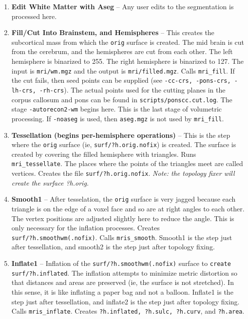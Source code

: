 \documentclass[paper=a4, fontsize=11pt]{scrartcl} %
\numberwithin{equation}{section} %
\numberwithin{figure}{section} %
\numberwithin{table}{section} %
\begin{document}
\begin{enumerate}
    \item \textbf{Edit White Matter with Aseg} -- Any user edits to the segmentation is processed here.
    
    \item \textbf{Fill/Cut Into Brainstem, and Hemispheres} --  This creates the subcortical mass from which the \texttt{orig} surface is created. The mid brain is cut from the cerebrum, and the hemispheres are cut from each other. The left hemisphere is binarized to 255. The right hemisphere is binarized to 127. The input is \texttt{mri/wm.mgz} and the output is \texttt{mri/filled.mgz}. Calls \texttt{mri\_fill}. If the cut fails, then seed points can be supplied (see \texttt{-cc-crs, -pons-crs, -lh-crs, -rh-crs}). The actual points used for the cutting planes in the corpus callosum and pons can be found in \texttt{scripts/ponscc.cut.log}. The stage \texttt{-autorecon2-wm} begins here. This is the last stage of volumetric processing. If \texttt{-noaseg} is used, then \texttt{aseg.mgz} is not used by \texttt{mri\_fill}.
    
    \item \textbf{Tessellation (begins per-hemisphere operations)} -- This is the step where the \texttt{orig} surface (ie, \texttt{surf/?h.orig.nofix}) is created. The surface is created by covering the filled hemisphere with triangles. Runs \texttt{mri\_tessellate}. The places where the points of the triangles meet are called vertices. Creates the file \texttt{surf/?h.orig.nofix}. \textit{Note: the topology fixer will create the surface ?h.orig.}
   
    \item \textbf{Smooth1} -- After tesselation, the \texttt{orig} surface is very jagged because each triangle is on the edge of a voxel face and so are at right angles to each other. The vertex positions are adjusted slightly here to reduce the angle. This is only necessary for the inflation processes. Creates \\ \texttt{surf/?h.smoothwm(.nofix)}. Calls \texttt{mris\_smooth}. Smooth1 is the step just after tessellation, and smooth2 is the step just after topology fixing.
    
    \item \textbf{Inflate1} -- Inflation of the \texttt{surf/?h.smoothwm(.nofix)} surface to \texttt{create surf/?h.inflated}. The inflation attempts to minimize metric distortion so that distances and areas are preserved (ie, the surface is not stretched). In this sense, it is like inflating a paper bag and not a balloon. Inflate1 is the step just after tessellation, and inflate2 is the step just after topology fixing. Calls \texttt{mris\_inflate}. Creates \texttt{?h.inflated, ?h.sulc, ?h.curv}, and \texttt{?h.area}.
    

\end{enumerate}
\end{document}
